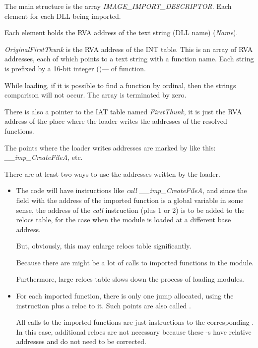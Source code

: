 The main structure is the array \emph{IMAGE\_IMPORT\_DESCRIPTOR}.
Each element for each DLL being imported.

Each element holds the \ac{RVA} address of the text string (DLL name) (\emph{Name}).

\emph{OriginalFirstThunk} is the \ac{RVA} address of the \ac{INT} table.
This is an array of \ac{RVA} addresses, each of which points to a text string with a function name.
Each string is prefixed by a 16-bit integer
()--- of function.

While loading, if it is possible to find a function by ordinal,
then the strings comparison will not occur. The array is terminated by zero.

There is also a pointer to the \ac{IAT} table named \emph{FirstThunk}, it is just the \ac{RVA} address
of the place where the loader writes the addresses of the resolved functions.

The points where the loader writes addresses are marked by \IDA like this: \emph{\_\_imp\_CreateFileA}, etc.

There are at least two ways to use the addresses written by the loader.

\begin{itemize}
\item The code will have instructions like \emph{call \_\_imp\_CreateFileA},
and since the field with the address of the imported function is a global variable in some sense,
the address of the \emph{call} instruction (plus 1 or 2) is to be added to the relocs table,
for the case when the module is loaded at a different base address.

But, obviously, this may enlarge relocs table significantly.

Because there are might be a lot of calls to imported functions in the module.

Furthermore, large relocs table slows down the process of loading modules.

\item For each imported function, there is only one jump allocated, using the \JMP instruction
plus a reloc to it.
Such points are also called .

All calls to the imported functions are just \CALL instructions to the corresponding .
In this case, additional relocs are not necessary because these \CALL{}-s
have relative addresses and do not need to be corrected.
\end{itemize}

